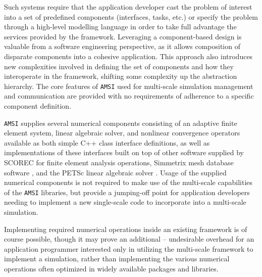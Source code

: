 \documentclass[11pt]{article}
\begin{document}
Such systems require that the application developer cast the problem of interest into a set of predefined components (interfaces, tasks, etc.) or specify the problem through a high-level modelling language in order to take full advantage the services provided by the framework.
Leveraging a component-based design is valuable from a software engineering perspective, as it allows composition of disparate components into a cohesive application.
This approach also introduces new complexities involved in defining the set of components and how they interoperate in the framework, shifting some complexity up the abstraction hierarchy.
The core features of \verb|AMSI| used for multi-scale simulation management and communication are provided with no requirements of adherence to a specific component definition.


\verb|AMSI| supplies several numerical components consisting of an adaptive finite element system, linear algebraic solver, and nonlinear convergence operators available as both simple C++ class interface definitions, as well as implementations of these interfaces built on top of other software supplied by SCOREC \cite{core} for finite element analysis operations, Simmetrix mesh database software \cite{simmetrix}, and the PETSc linear algebraic solver \cite{petsc-web-page,petsc-user-ref,petsc-efficient}.
Usage of the supplied numerical components is not required to make use of the multi-scale capabilities of the \verb|AMSI| libraries, but provide a jumping-off point for application developers needing to implement a new single-scale code to incorporate into a multi-scale simulation.

Implementing required numerical operations inside an existing framework is of course possible, though it may prove an additional -- undesirable overhead for an application programmer interested only in utilizing the multi-scale framework to implement a simulation, rather than implementing the various numerical operations often optimized in widely available packages and libraries.
\end{document}
